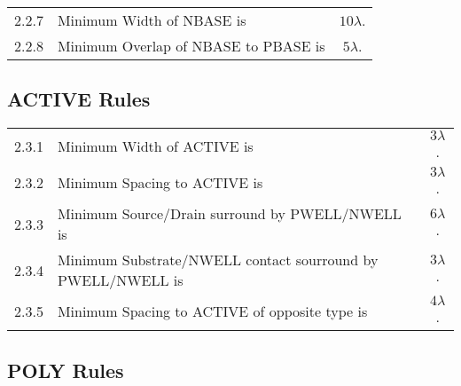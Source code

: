 \documentclass[10pt,a4paper,oneside]{article}
\newcounter{ct}
\begin{document}
\begin{center}
\end{center}

\begin{flushleft}
    \begin{tabular}{c l c}
        2.2.7  & Minimum Width of NBASE is & $ 10 \lambda $. \\
        2.2.8  & Minimum Overlap of NBASE to PBASE is & $ 5 \lambda $. \\
    \end{tabular}
\end{flushleft}


\subsection{ACTIVE Rules}\label{design_rules_active_rules}

\begin{flushleft}
    \begin{tabular}{c l c}
        2.3.1   & Minimum Width of ACTIVE is & $3 \lambda$. \\
        2.3.2   & Minimum Spacing to ACTIVE is & $3 \lambda$. \\
        2.3.3   & Minimum Source/Drain surround by PWELL/NWELL is & $6 \lambda$. \\
        2.3.4   & Minimum Substrate/NWELL contact sourround by PWELL/NWELL is & $3 \lambda$. \\
        2.3.5   & Minimum Spacing to ACTIVE of opposite type is & $4 \lambda$. \\
    \end{tabular}
\end{flushleft}

\subsection{POLY Rules}\label{design_rules_poly_rules}
\end{document}
